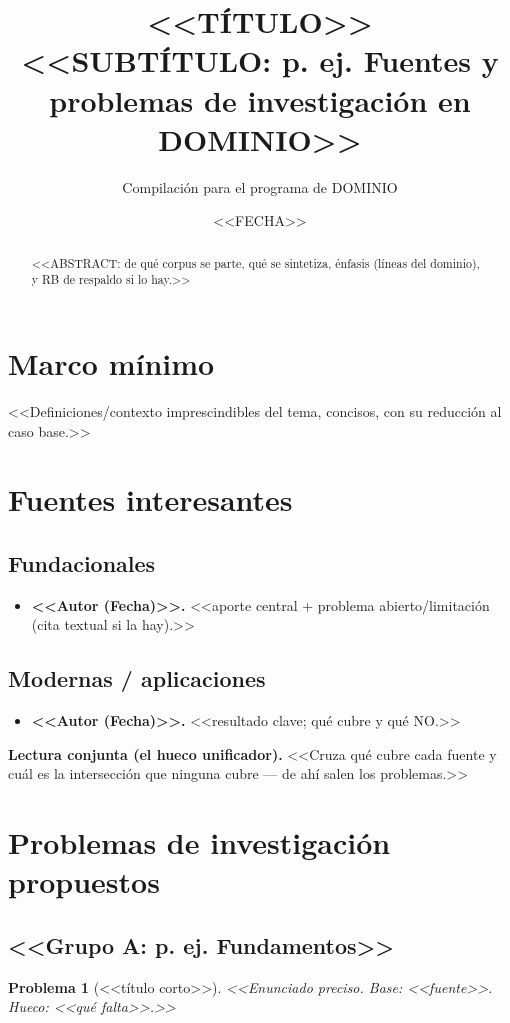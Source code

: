 \documentclass[11pt]{article}
\title{\vspace{-1.2cm}\textbf{<<TÍTULO>>}\\[4pt]
\large <<SUBTÍTULO: p. ej. Fuentes y problemas de investigación en {{DOMINIO}}>>}
\author{Compilación para el programa de {{DOMINIO}}}
\date{<<FECHA>>}
\newtheorem{problema}{Problema}
\begin{document}
\maketitle
\vspace{-0.6cm}

\begin{abstract}
\noindent <<ABSTRACT: de qué corpus se parte, qué se sintetiza, énfasis (líneas del dominio), y RB de respaldo si lo hay.>>
\end{abstract}

\section{Marco mínimo}
<<Definiciones/contexto imprescindibles del tema, concisos, con su reducción al caso base.>>

\section{Fuentes interesantes}
\subsection*{Fundacionales}
\begin{itemize}[leftmargin=1.4em,topsep=2pt,itemsep=3pt]
  \item \textbf{<<Autor (Fecha)>>.} <<aporte central + problema abierto/limitación (cita textual si la hay).>>
\end{itemize}
\subsection*{Modernas / aplicaciones}
\begin{itemize}[leftmargin=1.4em,topsep=2pt,itemsep=3pt]
  \item \textbf{<<Autor (Fecha)>>.} <<resultado clave; qué cubre y qué NO.>>
\end{itemize}

\begin{caja}
\textbf{Lectura conjunta (el hueco unificador).} <<Cruza qué cubre cada fuente y cuál es la intersección que ninguna cubre — de ahí salen los problemas.>>
\end{caja}

\section{Problemas de investigación propuestos}
\subsection*{<<Grupo A: p. ej. Fundamentos>>}
\begin{problema}[<<título corto>>]
<<Enunciado preciso. \emph{Base:} <<fuente>>. \emph{Hueco:} <<qué falta>>.>>
\end{problema}
\end{document}
